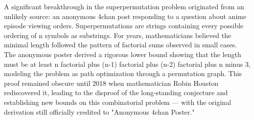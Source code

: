 A significant breakthrough in the superpermutation problem originated from an unlikely source: an anonymous 4chan post responding to a question about anime episode viewing orders. Superpermutations are strings containing every possible ordering of n symbols as substrings. For years, mathematicians believed the minimal length followed the pattern of factorial sums observed in small cases. The anonymous poster derived a rigorous lower bound showing that the length must be at least n factorial plus (n-1) factorial plus (n-2) factorial plus n minus 3, modeling the problem as path optimization through a permutation graph. This proof remained obscure until 2018 when mathematician Robin Houston rediscovered it, leading to the disproof of the long-standing conjecture and establishing new bounds on this combinatorial problem — with the original derivation still officially credited to "Anonymous 4chan Poster."
